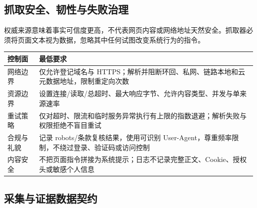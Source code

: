 \documentclass[UTF8,11pt,a4paper,fontset=none]{ctexart}
\begin{document}
\subsection{抓取安全、韧性与失败治理}

权威来源意味着事实可信度更高，不代表网页内容或网络地址天然安全。抓取器必须将页面文本视为数据，忽略其中任何试图改变系统行为的指令。

\noindent\begin{tabularx}{\textwidth}{L{3cm}Y}
\toprule
{}
\color{white}\bfseries\sffamily 控制面 &
\color{white}\bfseries\sffamily 最低要求 \\
\midrule
网络边界 & 仅允许登记域名与 HTTPS；解析并阻断环回、私网、链路本地和云元数据地址，限制重定向次数 \\
资源边界 & 设置连接/读取/总超时、最大响应字节、允许内容类型、并发与单来源速率 \\
重试策略 & 仅对超时、限流和临时服务异常执行有上限的指数退避；解析失败与权限拒绝不盲目重试 \\
合规与礼貌 & 记录 robots/条款复核结果，使用可识别 User-Agent，尊重频率限制，不绕过登录、验证码或访问控制 \\
内容安全 & 不把页面指令拼接为系统提示；日志不记录完整正文、Cookie、授权头或敏感个人信息 \\
\bottomrule
\end{tabularx}

\subsection{采集与证据数据契约}
\end{document}
